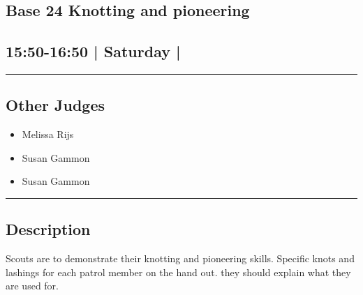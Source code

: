 \documentclass[10pt, A5]{article}
\begin{document}
		\begin{framed}
			\begin{minipage}{\textwidth}

			\setcounter{section}{56}
							\section{\faStar \: Base 24 \faStar \: Knotting and pioneering}
						
			\subsection*{15:50-16:50 | Saturday | }

			\vspace{0.25cm}
			\hrule
			\vspace{0.25cm}


			\subsection*{Other Judges}
							

				\begin{multicols}{2}

			\begin{itemize}
											\item Melissa Rijs
											\item Susan Gammon
								\end{itemize}

			\vfill\null
			\columnbreak

			\begin{itemize}
											\item Susan Gammon
								\end{itemize}

			\vfill\null

			\end{multicols}

			\vspace{0.25cm}
			\hrule
			\vspace{0.25cm}

			\begin{minipage}{\textwidth}
			\subsection*{\faListAlt \: Description}
			Scouts are to demonstrate their knotting and pioneering skills. Specific knots and lashings for each patrol member on the hand out. they should explain what they are used for.
			\end{minipage}


	\end{minipage}
	\end{framed}
\end{document}
